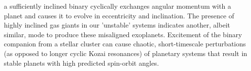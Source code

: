 \documentclass[manuscript]{aastex631}
\begin{document}
a sufficiently inclined binary cyclically exchanges angular momentum with a planet and causes it to evolve in eccentricity and inclination.
The presence of highly inclined gas giants in our 'unstable' systems
indicates another, albeit similar, mode to produce these misaligned exoplanets. Excitement of the binary companion from a stellar cluster
can cause chaotic, short-timescale perturbations (as opposed to longer cyclic Kozai resonances) of planetary systems that result in stable planets with 
high predicted spin-orbit angles.
\end{document}
